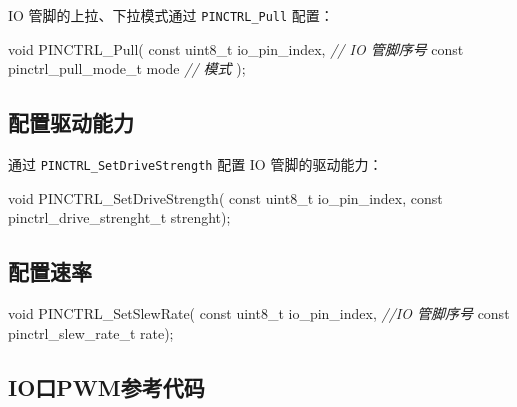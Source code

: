\documentclass[
  12pt,
]{book}
\newenvironment{Shaded}{\begin{snugshade}}{\end{snugshade}}
\newcommand{\CommentTok}[1]{\textcolor[rgb]{0.56,0.35,0.01}{\textit{#1}}}
\newcommand{\DataTypeTok}[1]{\textcolor[rgb]{0.13,0.29,0.53}{#1}}
\newcommand{\NormalTok}[1]{#1}
\begin{document}
IO 管脚的上拉、下拉模式通过 \texttt{PINCTRL\_Pull} 配置：

\begin{Shaded}
\begin{Highlighting}[]
\DataTypeTok{void}\NormalTok{ PINCTRL_Pull(}
  \DataTypeTok{const} \DataTypeTok{uint8_t}\NormalTok{ io_pin_index,     }\CommentTok{// IO 管脚序号}
  \DataTypeTok{const}\NormalTok{ pinctrl_pull_mode_t mode  }\CommentTok{// 模式}
\NormalTok{  );}
\end{Highlighting}
\end{Shaded}

\hypertarget{ux914dux7f6eux9a71ux52a8ux80fdux529b}{%
\subsection{配置驱动能力}\label{ux914dux7f6eux9a71ux52a8ux80fdux529b}}

通过 \texttt{PINCTRL\_SetDriveStrength} 配置 IO 管脚的驱动能力：

\begin{Shaded}
\begin{Highlighting}[]
\DataTypeTok{void}\NormalTok{ PINCTRL_SetDriveStrength(}
  \DataTypeTok{const} \DataTypeTok{uint8_t}\NormalTok{ io_pin_index,}
  \DataTypeTok{const}\NormalTok{ pinctrl_drive_strenght_t strenght);}
\end{Highlighting}
\end{Shaded}

\hypertarget{ux914dux7f6eux901fux7387}{%
\subsection{配置速率}\label{ux914dux7f6eux901fux7387}}

\begin{Shaded}
\begin{Highlighting}[]
\DataTypeTok{void}\NormalTok{ PINCTRL_SetSlewRate(}
  \DataTypeTok{const} \DataTypeTok{uint8_t}\NormalTok{ io_pin_index,   }\CommentTok{//IO 管脚序号}
  \DataTypeTok{const}\NormalTok{ pinctrl_slew_rate_t rate);  }
\end{Highlighting}
\end{Shaded}

\hypertarget{ioux53e3pwmux53c2ux8003ux4ee3ux7801}{%
\subsection{IO口PWM参考代码}\label{ioux53e3pwmux53c2ux8003ux4ee3ux7801}}
\end{document}
